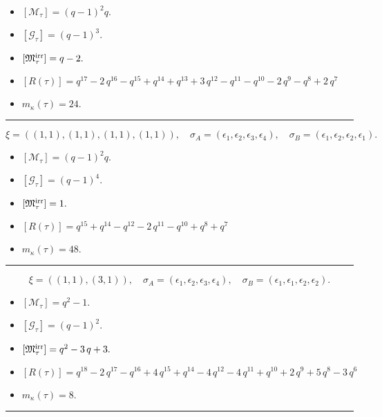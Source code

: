 \documentclass[10pt,a4paper]{amsart}
\begin{document}
\begin{itemize}
 \item $[\mathcal{M}_{\tau}] = {\left(q - 1\right)}^{2} q .$

 \item $[\mathcal{G}_{\tau}] = {\left(q - 1\right)}^{3} .$

 \item $[{\frak M}_{\tau}^{\textrm{irr}}] = q - 2 .$

 \item $[R(\tau)] = q^{17} - 2 \, q^{16} - q^{15} + q^{14} + q^{13} + 3 \, q^{12} - q^{11} - q^{10} - 2 \, q^{9} - q^{8} + 2 \, q^{7} $

 \item $m_{\kappa}(\tau) = 24 .$

 \end{itemize}
\noindent\rule{8cm}{0.4pt}

$$\xi = ({(1, 1), (1, 1)}, {(1, 1)}, {(1, 1)}),\quad \sigma_A = ({{\epsilon_1}, {\epsilon_2}}, {{\epsilon_3}}, {{\epsilon_4}}),\quad \sigma_B = ({{\epsilon_1}, {\epsilon_2}}, {{\epsilon_2}}, {{\epsilon_1}}).$$

\begin{itemize}
 \item $[\mathcal{M}_{\tau}] = {\left(q - 1\right)}^{2} q .$

 \item $[\mathcal{G}_{\tau}] = {\left(q - 1\right)}^{4} .$

 \item $[{\frak M}_{\tau}^{\textrm{irr}}] = 1 .$

 \item $[R(\tau)] = q^{15} + q^{14} - q^{12} - 2 \, q^{11} - q^{10} + q^{8} + q^{7} $

 \item $m_{\kappa}(\tau) = 48 .$

 \end{itemize}
\noindent\rule{8cm}{0.4pt}

$$\xi = ({(1, 1)}, {(3, 1)}),\quad \sigma_A = ({{\epsilon_1}}, {{\epsilon_2, \epsilon_3, \epsilon_4}}),\quad \sigma_B = ({{\epsilon_1}}, {{\epsilon_1, \epsilon_2, \epsilon_2}}).$$

\begin{itemize}
 \item $[\mathcal{M}_{\tau}] = q^{2} - 1 .$

 \item $[\mathcal{G}_{\tau}] = {\left(q - 1\right)}^{2} .$

 \item $[{\frak M}_{\tau}^{\textrm{irr}}] = q^{2} - 3 \, q + 3 .$

 \item $[R(\tau)] = q^{18} - 2 \, q^{17} - q^{16} + 4 \, q^{15} + q^{14} - 4 \, q^{12} - 4 \, q^{11} + q^{10} + 2 \, q^{9} + 5 \, q^{8} - 3 \, q^{6} $

 \item $m_{\kappa}(\tau) = 8 .$

 \end{itemize}
\noindent\rule{8cm}{0.4pt}
\end{document}
